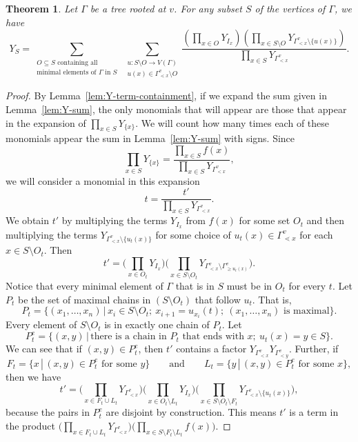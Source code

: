 \documentclass[pdftex]{sigma}
\numberwithin{equation}{section}
\newtheorem{Theorem}{Theorem}[section]
\begin{document}
\begin{Theorem}\label{thm:Y-formula}
Let $\Gamma$ be a tree rooted at $v$. For any subset $S$ of the vertices of $\Gamma$, we have
\[ Y_S=\sum_{\substack{O\subseteq S\text{ containing all}\\ \text{minimal elements of }\Gamma\text{ in }S}} \, \sum_{\substack{u\colon S\setminus O\to V(\Gamma)\\ u(x)\in\Gamma_{\lessdot x}^v\setminus O}}\frac{\left(\prod_{x\in O}Y_{I_x} \right)\left(\prod_{x\in S\setminus O}Y_{\Gamma_{< x}^v\setminus\{u(x)\}} \right)}{\prod_{x\in S}Y_{\Gamma_{< x}^v}}.\]
\end{Theorem}
\begin{proof}
By Lemma~\ref{lem:Y-term-containment}, if we expand the sum given in Lemma~\ref{lem:Y-sum}, the only monomials that will appear are those that appear in the expansion of $\prod_{x\in S}Y_{\{x\}}$. We will count how many times each of these monomials appear the sum in Lemma~\ref{lem:Y-sum} with signs.
Since
\[ \prod_{x\in S}Y_{\{x\}}=\frac{\prod_{x\in S}f(x)}{\prod_{x\in S}Y_{\Gamma_{< x}^v}},\]
we will consider a monomial in this expansion
\[ t=\frac{t'}{\prod_{x\in S}Y_{\Gamma_{< x}^v}}.\]
We obtain $t'$ by multiplying the terms $Y_{I_x}$ from $f(x)$ for some set $O_t$ and then multiplying the terms $Y_{\Gamma_{< x}^v\setminus\{u_t(x)\}}$ for some choice of $u_t(x)\in\Gamma_{\lessdot x}^v$ for each $x\in S\setminus O_t$. Then \[ t'=\bigg(\prod_{x\in O_t}Y_{I_x} \bigg)\bigg(\prod_{x\in S\setminus O_t}Y_{\Gamma_{< x}^v\setminus\Gamma_{\geq u_t(x)}^v} \bigg).\]
Notice that every minimal element of $\Gamma$ that is in $S$ must be in $O_t$ for every $t$.
Let $P_t$ be the set of maximal chains in $(S\setminus O_t)$ that follow $u_t$. That is,
\[ P_t=\{(x_1,\dots,x_n)\, |\, x_i\in S\setminus O_t;\ x_{i+1}=u_{x_i}(t);\ (x_1,\dots,x_n)\text{ is maximal}\}.\]
Every element of $S\setminus O_t$ is in exactly one chain of $P_t$. Let \[ P_t^e=\{(x,y)\, |\, \text{there is a chain in }P_t\text{ that ends with }x;\ u_t(x)=y\in S\}.\]
We can see that if $(x,y)\in P_t^e$, then $t'$ contains a factor $Y_{\Gamma_{< x}^v}Y_{\Gamma_{< y}^v}$. Further, if
\[
F_t=\{x\, |\, (x,y)\in P_t^e\text{ for some }y\} \qquad \text{and} \qquad L_t=\{y\, |\, (x,y)\in P_t^e\text{ for some }x\},
\] then we have
\[ t'=\bigg(\prod_{x\in F_t\cup L_t}Y_{\Gamma_{< x}^v}\bigg)\bigg(\prod_{x\in O_t\setminus L_t}Y_{I_x} \bigg)\bigg(\prod_{x\in S\setminus O_t\setminus F_t}Y_{\Gamma_{< x}^v\setminus\{u_t(x)\}} \bigg),\]
because the pairs in $P_t^e$ are disjoint by construction. This means $t'$ is a term in the product $\big(\prod_{x\in F_t\cup L_t}Y_{\Gamma_{< x}^v}\big)\big(\prod_{x\in S\setminus F_t\setminus L_t} f(x) \big)$.

\end{proof}
\end{document}
